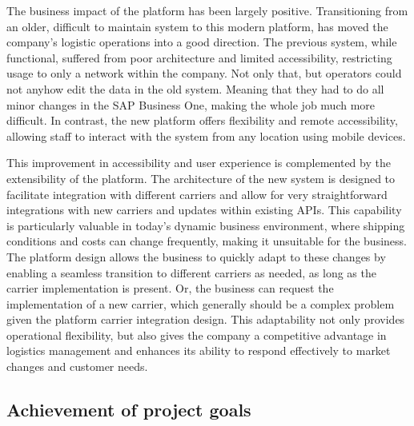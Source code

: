 The business impact of the platform has been largely positive.
Transitioning from an older, difficult to maintain system to this modern platform, has moved the company's logistic operations into a good direction.
The previous system, while functional, suffered from poor architecture and limited accessibility, restricting usage to only a network within the company.
Not only that, but operators could not anyhow edit the data in the old system. 
Meaning that they had to do all minor changes in the SAP Business One, making the whole job much more difficult. 
In contrast, the new platform offers flexibility and remote accessibility, allowing staff to interact with the system from any location using mobile devices.

This improvement in accessibility and user experience is complemented by the extensibility of the platform. 
The architecture of the new system is designed to facilitate integration with different carriers and allow for very straightforward integrations with new carriers and updates within existing APIs. 
This capability is particularly valuable in today's dynamic business environment, where shipping conditions and costs can change frequently, making it unsuitable for the business.
The platform design allows the business to quickly adapt to these changes by enabling a seamless transition to different carriers as needed, as long as the carrier implementation is present.
Or, the business can request the implementation of a new carrier, which generally should be a complex problem given the platform carrier integration design. 
This adaptability not only provides operational flexibility, but also gives the company a competitive advantage in logistics management and enhances its ability to respond effectively to market changes and customer needs.


\subsection{Achievement of project goals}
\label{subsec:achievement-project-goals}

